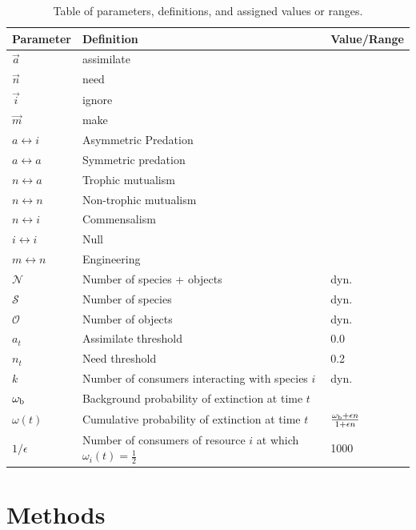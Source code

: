\documentclass[twocolumn,preprintnumbers,amsmath,amssymb,superscriptaddress]{revtex4}
\begin{document}
\begin{table}[!t]
\begin{center}
\begin{tabular}{ l l l }
\hline
Parameter & Definition & Value/Range \\
\hline
$\overrightarrow{a}$ & assimilate & \\
$\overrightarrow{n}$ & need & \\
$\overrightarrow{i}$ & ignore & \\
$\overrightarrow{m}$ & make & \\
\hline
$a \leftrightarrow i$ & Asymmetric Predation &  \\
$a \leftrightarrow a$ & Symmetric predation & \\
$n \leftrightarrow a$ & Trophic mutualism & \\
$n \leftrightarrow n$ & Non-trophic mutualism & \\
$n \leftrightarrow i$ & Commensalism & \\
$i \leftrightarrow i$ & Null & \\
$m \leftrightarrow n$ & Engineering & \\
\hline
$\mathcal{N}$ & Number of species + objects & dyn.\\
$\mathcal{S}$ & Number of species & dyn.\\
$\mathcal{O}$ & Number of objects & dyn.\\
$a_t$ & Assimilate threshold & 0.0\\
$n_t$ & Need threshold & 0.2\\
$k$ & Number of consumers interacting with species $i$ & dyn.\\
$\omega_{\rm b}$ & Background probability of extinction at time $t$\\
$\omega(t)$ & Cumulative probability of extinction at time $t$ & $\frac{\omega_{\rm b} + \epsilon n}{1 + \epsilon n}$\\
$1/\epsilon$ & Number of consumers of resource $i$ at which $\omega_i(t)=\frac{1}{2}$ & 1000\\
\hline
\end{tabular}
\end{center}
\caption{Table of parameters, definitions, and assigned values or ranges.}
\end{table}



\section{Methods}
\end{document}
